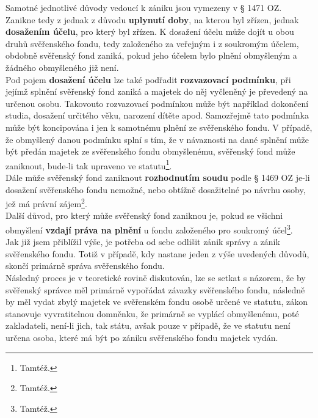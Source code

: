 \documentclass{article}
\begin{document}
Samotné jednotlivé důvody vedoucí k zániku jsou vymezeny v § 1471 OZ.\\

Zanikne tedy z jednak z důvodu \textbf{uplynutí doby}, na kterou byl zřízen, jednak \textbf{dosažením účelu}, pro který byl zřízen. K dosažení účelu může dojít u obou druhů svěřenského fondu, tedy založeného za veřejným i z soukromým účelem, obdobně svěřenský fond zaniká, pokud jeho účelem bylo plnění obmyšleným a žádného obmyšleného již není.\\

Pod pojem \textbf{dosažení účelu} lze také podřadit \textbf{rozvazovací podmínku}, při jejímž splnění svěřenský fond zaniká a majetek do něj vyčleněný je převedený na určenou osobu. Takovouto rozvazovací podmínkou může být například dokončení studia, dosažení určitého věku, narození dítěte apod. Samozřejmě tato podmínka může být koncipována i jen k samotnému plnění ze svěřenského fondu. V případě, že obmyšlený danou podmínku splní s tím, že v návaznosti na dané splnění může být předán majetek ze svěřenského fondu obmyšlenému, svěřenský fond může zaniknout, bude-li tak upraveno ve statutu\footnote{Tamtéž.}.\\

Dále může svěřenský fond zaniknout \textbf{rozhodnutím soudu} podle § 1469 OZ je-li dosažení svěřenského fondu nemožné, nebo obtížně dosažitelné po návrhu osoby, jež má právní zájem\footnote{Tamtéž.}.\\

Další důvod, pro který může svěřenský fond zaniknou je, pokud se všichni obmyšlení \textbf{vzdají práva na plnění} u fondu založeného pro soukromý účel\footnote{Tamtéž.}.\\



Jak již jsem přiblížil výše, je potřeba od sebe odlišit zánik správy a zánik svěřenského fondu. Totiž v případě, kdy nastane jeden z výše uvedených důvodů, skončí primárně správa svěřenského fondu.\\

Následný proces je v teoretické rovině diskutován, lze se setkat s názorem, že by svěřenský správce měl primárně vypořádat závazky svěřenského fondu, následně by měl vydat zbylý majetek ve svěřenském fondu osobě určené ve statutu, zákon stanovuje vyvratitelnou domněnku, že primárně se vyplácí obmyšlenému, poté zakladateli, není-li jich, tak státu, avšak pouze v případě, že ve statutu není určena osoba, které má být po zániku svěřenského fondu majetek vydán.\\
\end{document}

